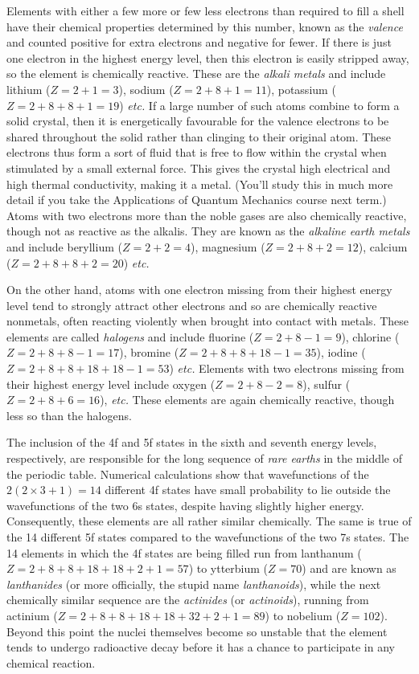 \documentclass{article}
\theoremstyle{plain}\theoremheaderfont{\normalfont\itshape}\theorembodyfont{\rmfamily}\theoremseparator{.}\newtheorem*{rem}{Remark}\newtheorem*{ex}{Example}\newtheorem*{proof}{Proof}\newtheorem*{altp}{Alternative proof}
\theoremstyle{plain}\theoremheaderfont{\normalfont\bfseries}\theorembodyfont{\rmfamily}\theoremseparator{.}\newtheorem{thm}{Theorem}[section]\newtheorem{lem}[thm]{Lemma}\newtheorem{prop}[thm]{Proposition}\newtheorem*{cor}{Corollary}\newtheorem{defn}[thm]{Definition}\newtheorem{clm}[thm]{Claim}\newtheorem{clminproof}{Claim}
\theoremstyle{break}\theoremheaderfont{\normalfont\itshape}\theorembodyfont{\rmfamily}\theoremseparator{.\medskip}\newtheorem*{proofskip}{Proof}\newtheorem*{exs}{Examples}\newtheorem*{rems}{Remarks}
\theoremstyle{break}\theoremheaderfont{\normalfont\bfseries}\theorembodyfont{\rmfamily}\theoremseparator{.\medskip}\newtheorem{lemskip}[thm]{Lemma}\newtheorem{defnskip}[thm]{Definition}\newtheorem{propskip}[thm]{Proposition}\newtheorem{thmskip}[thm]{Theorem}
\numberwithin{equation}{section}
\begin{document}
    Elements with either a few more or few less electrons than required to fill a shell have their chemical properties determined by this number, known as the \textit{valence} and counted positive for extra electrons and negative for fewer. If there is just one electron in the highest energy level, then this electron is easily stripped away, so the element is chemically reactive. These are the \textit{alkali metals} and include lithium (\(Z=2+1=3\)), sodium (\(Z=2+8+1=11\)), potassium (\(Z=2+8+8+1=19\)) \textit{etc.} If a large number of such atoms combine to form a solid crystal, then it is energetically favourable for the valence electrons to be shared throughout the solid rather than clinging to their original atom. These electrons thus form a sort of fluid that is free to flow within the crystal when stimulated by a small external force. This gives the crystal high electrical and high thermal conductivity, making it a metal. (You'll study this in much more detail if you take the Applications of Quantum Mechanics course next term.) Atoms with two electrons more than the noble gases are also chemically reactive, though not as reactive as the alkalis. They are known as the \textit{alkaline earth metals} and include beryllium (\(Z=2+2=4\)), magnesium (\(Z=2+8+2=12\)), calcium (\(Z=2+8+8+2=20\)) \textit{etc.}

    On the other hand, atoms with one electron missing from their highest energy level tend to strongly attract other electrons and so are chemically reactive nonmetals, often reacting violently when brought into contact with metals. These elements are called \textit{halogens} and include fluorine (\(Z=2+8-1=9\)), chlorine (\(Z=2+8+8-1=17\)), bromine (\(Z=2+8+8+18-1=35\)), iodine (\(Z=2+8+8+18+18-1=53\)) \textit{etc.} Elements with two electrons missing from their highest energy level include oxygen (\(Z=2+8-2=8\)), sulfur (\(Z=2+8+6=16\)), \textit{etc.} These elements are again chemically reactive, though less so than the halogens.

    The inclusion of the 4f and 5f states in the sixth and seventh energy levels, respectively, are responsible for the long sequence of \textit{rare earths} in the middle of the periodic table. Numerical calculations show that wavefunctions of the \(2(2\times 3+1)=14\) different 4f states have small probability to lie outside the wavefunctions of the two 6s states, despite having slightly higher energy. Consequently, these elements are all rather similar chemically. The same is true of the 14 different 5f states compared to the wavefunctions of the two 7s states. The 14 elements in which the 4f states are being filled run from lanthanum (\(Z=2+8+8+18+18+2+1=57\)) to ytterbium (\(Z=70\)) and are known as \textit{lanthanides} (or more officially, the stupid name \textit{lanthanoids}), while the next chemically similar sequence are the \textit{actinides} (or \textit{actinoids}), running from actinium (\(Z=2+8+8+18+18+32+2+1=89\)) to nobelium (\(Z=102\)). Beyond this point the nuclei themselves become so unstable that the element tends to undergo radioactive decay before it has a chance to participate in any chemical reaction.
\end{document}
